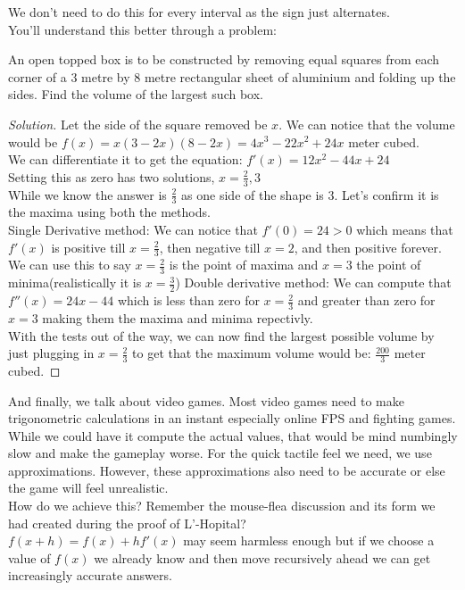 We don't need to do this for every interval as the sign just alternates.\\
You'll understand this better through a problem:\\
\begin{example}
    An open topped box is to be constructed by removing equal squares from
each corner of a 3 metre by 8 metre rectangular sheet of aluminium and folding up the sides. Find the volume of the largest such box.
\end{example}
\begin{proof}
    [Solution]
    Let the side of the square removed be $x$. We can notice that the volume would be $f(x)=x(3-2x)(8-2x)=4x^3-22x^2+24x$  meter cubed.\\
    We can differentiate it to get the equation: $f'(x)=12x^2-44x+24$\\
    Setting this as zero has two solutions, $x=\frac{2}{3}, 3$\\
    While we know the answer is $\frac{2}{3}$ as one side of the shape is $3$. Let's confirm it is the maxima using both the methods.\\
    Single Derivative method: We can notice that $f'(0)=24>0$ which means that $f'(x)$ is positive till $x=\frac{2}{3}$, then negative till $x=2$, and then positive forever. \\
    We can use this to say $x=\frac{2}{3}$ is the point of maxima and $x=3$ the point of minima(realistically it is $x=\frac{3}{2}$)
Double derivative method: We can compute that $f''(x)=24x-44$ which is less than zero for $x=\frac{2}{3}$ and greater than zero for $x=3$ making them the maxima and minima repectivly.\\
With the tests out of the way, we can now find the largest possible volume by just plugging in $x=\frac{2}{3}$ to get that the maximum volume would be: $\frac{200}{3}$ meter cubed.
\end{proof}
And finally, we talk about video games. Most video games need to make trigonometric calculations in an instant especially online FPS and fighting games. While we could have it compute the actual values, that would be mind numbingly slow and make the gameplay worse. For the quick tactile feel we need, we use approximations. However, these approximations also need to be accurate or else the game will feel unrealistic.\\
How do we achieve this? Remember the mouse-flea discussion and its form we had created during the proof of L'-Hopital?\\
$f(x+h)=f(x)+hf'(x)$ may seem harmless enough but if we choose a value of $f(x)$ we already know and then move recursively ahead we can get increasingly accurate answers.\\

